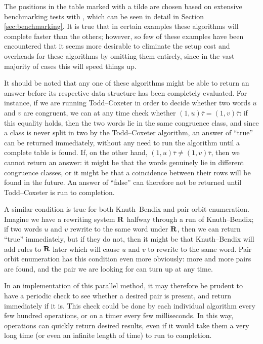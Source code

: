 The positions in the table marked with a tilde are chosen based on extensive
benchmarking tests with \libsemigroups{}, which can be seen in detail in
Section \ref{sec:benchmarking}.  It is true that in certain examples these
algorithms will complete faster than the others; however, so few of these
examples have been encountered that it seems more desirable to eliminate the
setup cost and overheads for these algorithms by omitting them entirely, since
in the vast majority of cases this will speed things up.

It should be noted that any one of these algorithms might be able to return an
answer before its respective data structure has been completely evaluated.  For
instance, if we are running Todd--Coxeter in order to decide whether two words
$u$ and $v$ are congruent, we can at any time check whether
$(1,u)\bar\tau = (1,v)\bar\tau$: if this equality holds, then the two words lie
in the same congruence class, and since a class is never split in two by the
Todd--Coxeter algorithm, an answer of ``true'' can be returned immediately,
without any need to run the algorithm until a complete table is found.  If, on
the other hand, $(1,u)\bar\tau \neq (1,v)\bar\tau$, then we cannot return an
answer: it might be that the words genuinely lie in different congruence
classes, or it might be that a coincidence between their rows will be found in
the future.  An answer of ``false'' can therefore not be returned until
Todd--Coxeter is run to completion.

A similar condition is true for both Knuth--Bendix and pair orbit enumeration.
Imagine we have a rewriting system $\mathbf{R}$ halfway through a run of Knuth--Bendix;
if two words $u$ and $v$ rewrite to the same word under $\mathbf{R}$, then we can
return ``true'' immediately, but if they do not, then it might be that
Knuth--Bendix will add rules to $\mathbf{R}$ later which will cause $u$ and $v$ to
rewrite to the same word.  Pair orbit enumeration has this condition even more
obviously: more and more pairs are found, and the pair we are looking for can
turn up at any time.

In an implementation of this parallel method, it may therefore be prudent to
have a periodic check to see whether a desired pair is present, and return
immediately if it is.  This check could be done by each individual algorithm
every few hundred operations, or on a timer every few milliseconds.  In this
way, operations can quickly return desired results, even if it would take them a
very long time (or even an infinite length of time) to run to completion.

